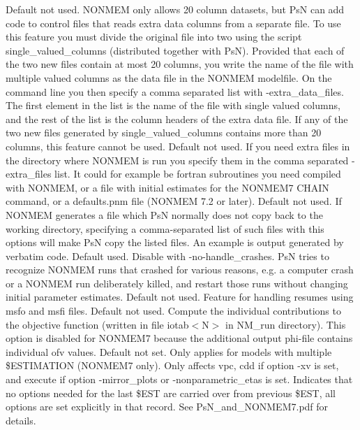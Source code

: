 \begin{optionlist}
\nextopt
{}
Default not used. NONMEM only allows 20 column datasets, but PsN can add code to control files that reads extra data columns from a separate file. To use this feature you must divide the original file into two using the script single\_valued\_columns (distributed together with PsN). Provided that each of the two new files contain at most 20 columns, you write the name of the file with multiple valued columns as the data file in the NONMEM modelfile. On the command line you then specify a comma separated list with -extra\_data\_files. The first element in the list is the name of the file with single valued columns, and the rest of the list is the column headers of the extra data file. If any of the two new files generated by single\_valued\_columns contains more than 20 columns, this feature cannot be used. 
\nextopt
{}
Default not used. If you need extra files in the directory where NONMEM is run you specify them in the comma separated -extra\_files list. It could for example be fortran subroutines you need compiled with NONMEM, or a file with initial estimates for the NONMEM7 CHAIN command, or a defaults.pnm file (NONMEM 7.2 or later). 
\nextopt
{}
Default not used. If NONMEM generates a file which PsN normally does not copy back to the working directory, specifying a comma-separated list of such files with this options will make PsN copy the listed files. An example is output generated by verbatim code. 
\nextopt
{}
Default used. Disable with -no-handle\_crashes. PsN tries to recognize NONMEM runs that crashed for various reasons, e.g. a computer crash or a NONMEM run deliberately killed, and restart those runs without changing initial parameter estimates. 
\nextopt
{}
Default not used. Feature for handling resumes using msfo and msfi files. 
\nextopt
{}
Default not used. Compute the individual contributions to the objective function (written in file iotab$<$N$>$ in NM\_run directory). This option is disabled for NONMEM7 because the additional output phi-file contains individual ofv values. 
\nextopt
{}
Default not set. Only applies for models with multiple \$ESTIMATION (NONMEM7 only). Only affects vpc,  cdd if option -xv is set, and execute if option -mirror\_plots or -nonparametric\_etas is set. Indicates that no options needed for the last \$EST are carried over from previous \$EST, all options are set explicitly in that record. See PsN\_and\_NONMEM7.pdf for details. 

\end{optionlist}
